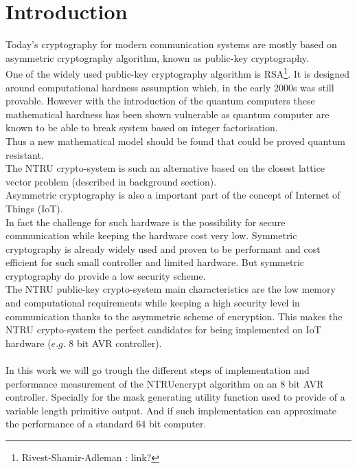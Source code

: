 \section{Introduction}
Today's cryptography for modern communication systems are mostly based on asymmetric cryptography algorithm, known as public-key cryptography.\\ One of the widely used public-key cryptography algorithm is RSA\footnote{Rivest-Shamir-Adleman : link?}. It is designed around computational hardness assumption which, in the early 2000s was still provable. However with the introduction of the quantum computers these mathematical hardness has been shown vulnerable as quantum computer are known to be able to break system based on integer factorisation.\\
Thus a new mathematical model should be found that could be proved quantum resistant. \\
The NTRU crypto-system is such an alternative based on the closest lattice vector problem (described in background section).\\
Asymmetric cryptography is also a important part of the concept of Internet of Things (IoT). \\In fact the challenge for such hardware is the possibility for secure communication while keeping the hardware cost very low. Symmetric cryptography is already widely used and proven to be performant and cost efficient for such small controller and limited hardware. But symmetric cryptography do provide a low security scheme. \\
The NTRU public-key crypto-system main characteristics are the low memory and computational requirements while keeping a high security level in communication thanks to the asymmetric scheme of encryption. This makes the NTRU crypto-system the perfect candidates for being implemented on IoT hardware ($e.g.$ 8 bit AVR controller).\\
\\
In this work we will go trough the different steps of implementation and performance measurement of  the NTRUencrypt algorithm on an 8 bit AVR controller. Specially for the mask generating utility function used to provide of a variable length primitive output. And if such implementation can approximate the performance of a standard 64 bit computer. 